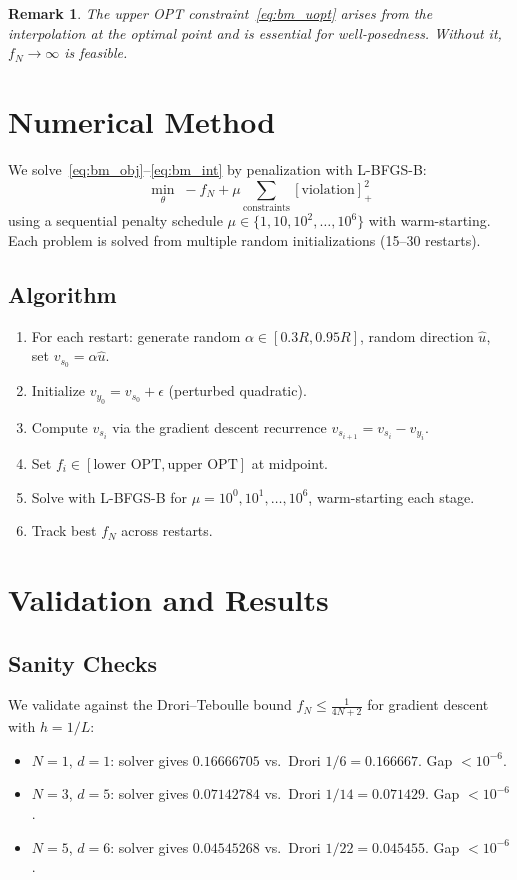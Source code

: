 \documentclass[11pt]{article}
\newtheorem{remark}{Remark}
\begin{document}
\begin{remark}
The upper OPT constraint~\eqref{eq:bm_uopt} arises from the interpolation at the optimal point and is essential for well-posedness.
Without it, $f_N \to \infty$ is feasible.
\end{remark}

\section{Numerical Method}

We solve~\eqref{eq:bm_obj}--\eqref{eq:bm_int} by penalization with L-BFGS-B:
\[
\min_\theta \; -f_N + \mu \sum_{\text{constraints}} [\text{violation}]^2_+
\]
using a sequential penalty schedule $\mu \in \{1, 10, 10^2, \ldots, 10^6\}$ with warm-starting.
Each problem is solved from multiple random initializations (15--30 restarts).

\subsection{Algorithm}
\begin{enumerate}
\item For each restart: generate random $\alpha \in [0.3R, 0.95R]$, random direction $\hat{u}$, set $v_{s_0} = \alpha \hat{u}$.
\item Initialize $v_{y_0} = v_{s_0} + \epsilon$ (perturbed quadratic).
\item Compute $v_{s_i}$ via the gradient descent recurrence $v_{s_{i+1}} = v_{s_i} - v_{y_i}$.
\item Set $f_i \in [\text{lower OPT}, \text{upper OPT}]$ at midpoint.
\item Solve with L-BFGS-B for $\mu = 10^0, 10^1, \ldots, 10^6$, warm-starting each stage.
\item Track best $f_N$ across restarts.
\end{enumerate}

\section{Validation and Results}

\subsection{Sanity Checks}

We validate against the Drori--Teboulle bound $f_N \leq \frac{1}{4N+2}$ for gradient descent with $h = 1/L$:
\begin{itemize}
\item $N=1$, $d=1$: solver gives $0.16666705$ vs.\ Drori $1/6 = 0.166667$. Gap $< 10^{-6}$.
\item $N=3$, $d=5$: solver gives $0.07142784$ vs.\ Drori $1/14 = 0.071429$. Gap $< 10^{-6}$.
\item $N=5$, $d=6$: solver gives $0.04545268$ vs.\ Drori $1/22 = 0.045455$. Gap $< 10^{-6}$.
\end{itemize}
\end{document}
